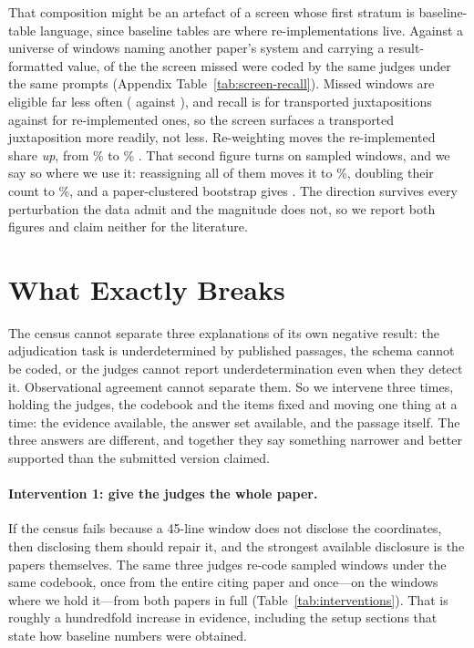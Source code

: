 \documentclass[11pt]{article}
\begin{document}
That composition might be an artefact of a screen whose first stratum is
baseline-table language, since baseline tables are where re-implementations
live. Against a universe of \RecUniverse{} windows naming another paper's system
and carrying a result-formatted value, \RecSampled{} of the \RecMissed{} the
screen missed were coded by the same judges under the same prompts (Appendix
Table~\ref{tab:screen-recall}). Missed windows are eligible far less often
(\RecEligMissed{} against \RecEligFrame{}), and recall is \RecTrans{}
\RecTransCI{} for transported juxtapositions against \RecReimpl{}
\RecReimplCI{} for re-implemented ones, so the screen surfaces a transported
juxtaposition more readily, not less. Re-weighting moves the re-implemented
share \emph{up}, from \RecFrameShare\% to \RecUniverseShare\%
\RecUniverseShareCI{}. That second figure turns on \RecTransEligN{} sampled
windows, and we say so where we use it: reassigning all of them moves it to
\RecPerturbAll\%, doubling their count to \RecPerturbDouble\%, and a
paper-clustered bootstrap gives \RecPaperCI{}. The direction survives every
perturbation the data admit and the magnitude does not, so we report both
figures and claim neither for the literature.

\section{What Exactly Breaks}
\label{sec:instrument}

The census cannot separate three explanations of its own negative result: the
adjudication task is underdetermined by published passages, the schema cannot be
coded, or the judges cannot report underdetermination even when they detect it.
Observational agreement cannot separate them. So we intervene three times,
holding the judges, the codebook and the items fixed and moving one thing at a
time: the evidence available, the answer set available, and the passage itself.
The three answers are different, and together they say something narrower and
better supported than the submitted version claimed.

\paragraph{Intervention 1: give the judges the whole paper.}
If the census fails because a \mbox{45-line} window does not disclose the
coordinates, then disclosing them should repair it, and the strongest available
disclosure is the papers themselves. The same three judges re-code \PrivN{}
sampled windows under the same codebook, once from the entire citing paper and
once---on the \PrivBoth{} windows where we hold it---from both papers in full
(Table~\ref{tab:interventions}). That is roughly a hundredfold increase in
evidence, including the setup sections that state how baseline numbers were
obtained.
\end{document}
